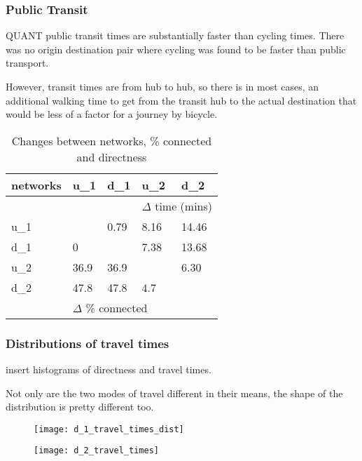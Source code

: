\subsubsection{Public Transit}

QUANT public transit times are substantially faster than cycling times. There was no origin destination pair where cycling was found to be faster than public transport. 

However, transit times are from hub to hub, so there is in most cases, an additional walking time to get from the transit hub to the actual destination that would be less of a factor for a journey by bicycle. 

\begin{table}
\centering
\begin{tabular}{@{}lllll@{}}
\toprule
networks & u\_1   & d\_1  & u\_2            & d\_2          \\ \midrule
         &        &       & \multicolumn{2}{l}{$\Delta$ time (mins)}  \\
u\_1     &       &  0.79 & 8.16            & 14.46         \\
d\_1     & 0      &      & 7.38            & 13.68         \\
u\_2     & 36.9   & 36.9  &                & 6.30          \\
d\_2     & 47.8   & 47.8  & 4.7             &              \\
         & \multicolumn{3}{l}{$\Delta$ \% connected} &               \\ \bottomrule
\end{tabular}
\caption{Changes between networks, \% connected and directness}
\label{table:change between nets}
\end{table}


\subsubsection{Distributions of travel times}

insert histograms of directness and travel times.

Not only are the two modes of travel different in their means, the shape of the distribution is pretty different too. 


\begin{figure}
\centering
\begin{minipage}{.5\textwidth}
  \centering
  \texttt{[image: d\_1\_travel\_times\_dist]}
  \label{fig:d1_distrib}
\end{minipage}%
\begin{minipage}{.5\textwidth}
  \centering
  \texttt{[image: d\_2\_travel\_times]}
  \label{fig:d2_distrib}
\end{minipage}
\end{figure}

